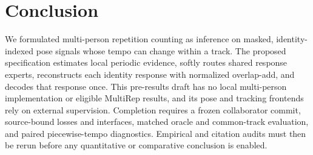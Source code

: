 \section{Conclusion}
\label{sec:conclusion}

We formulated multi-person repetition counting as inference on masked,
identity-indexed pose signals whose tempo can change within a track. The
proposed specification estimates local periodic evidence, softly routes shared
response experts, reconstructs each identity response with normalized
overlap-add, and decodes that response once. This pre-results draft has no
local multi-person implementation or eligible MultiRep results, and its pose
and tracking frontends rely on external supervision. Completion requires a
frozen collaborator commit, source-bound losses and interfaces, matched oracle
and common-track evaluation, and paired piecewise-tempo diagnostics. Empirical
and citation audits must then be rerun before any quantitative or comparative
conclusion is enabled.
